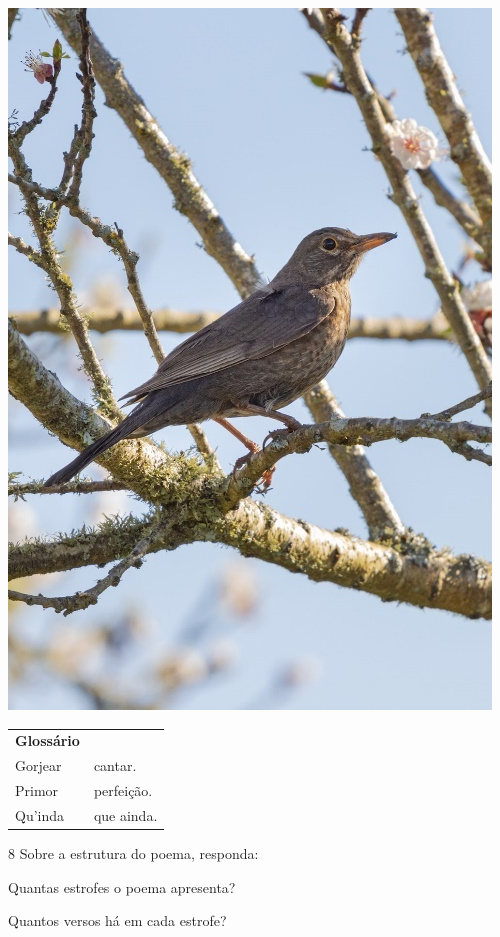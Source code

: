 \begin{minipage}{.5\textwidth}
\includegraphics[width=\textwidth]{./imgs/img17.jpg}
\end{minipage}

\begin{tabular}{ll}
\textbf{Glossário} & \mbox{}\\
Gorjear & cantar.\\
Primor & perfeição.\\
Qu'inda & que ainda.\\
\end{tabular}

\pagebreak
\num{8} Sobre a estrutura do poema, responda:

\begin{escolha}
\item Quantas estrofes o poema apresenta?


\item Quantos versos há em cada estrofe?

\end{escolha}


